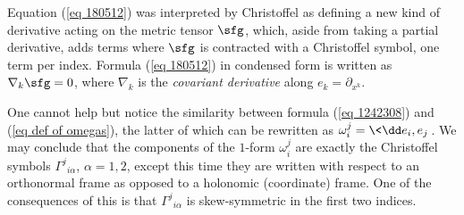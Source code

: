 \begin{rem}
    Equation (\ref{eq 180512}) was interpreted by Christoffel as defining a new kind of derivative acting on the metric tensor $\sfg$, which, aside from taking a partial derivative, adds terms where $\sfg$ is contracted with a Christoffel symbol, one term per index. Formula (\ref{eq 180512}) in condensed form is written as $\nabla_k \sfg=0$, where $\nabla_k$ is the \emph{covariant derivative} along $e_k=\partial_{x^k}$.

    One cannot help but notice the similarity between formula (\ref{eq 1242308}) and (\ref{eq def of omegas}), the latter of which can be rewritten as $\omega^j_i=\<\dd e_i,e_j\>$. We may conclude that the components of the $1$-form $\omega^j_i$ are exactly the Christoffel symbols $\Gamma^j{}_{i\alpha}$, $\alpha=1,2$, except this time they are written with respect to an orthonormal frame as opposed to a holonomic (coordinate) frame. One of the consequences of this is that $\Gamma^j{}_{i\alpha}$ is skew-symmetric in the first two indices.
    

\end{rem}
